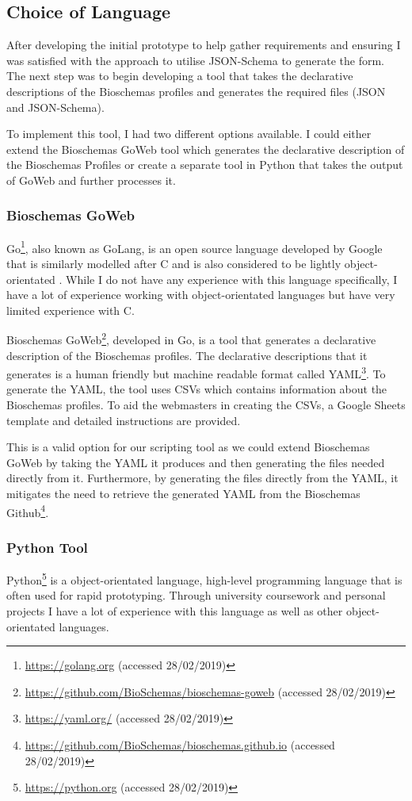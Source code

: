 \subsection{Choice of Language}
After developing the initial prototype to help gather requirements and ensuring I was satisfied with the approach to utilise JSON-Schema to generate the form. The next step was to begin developing a tool that takes the declarative descriptions of the Bioschemas profiles and generates the required files (JSON and JSON-Schema).

To implement this tool, I had two different options available. I could either extend the Bioschemas GoWeb tool which generates the declarative description of the Bioschemas Profiles or create a separate tool in Python that takes the output of GoWeb and further processes it.

\subsubsection{Bioschemas GoWeb}
Go\footnote{\url{https://golang.org} (accessed 28/02/2019)}, also known as GoLang, is an open source language developed by Google that is similarly modelled after C \cite{goLang} and is also considered to be lightly object-orientated \cite{goObject}. While I do not have any experience with this language specifically, I have a lot of experience working with object-orientated languages but have very limited experience with C. 

Bioschemas GoWeb\footnote{\url{https://github.com/BioSchemas/bioschemas-goweb} (accessed 28/02/2019)}, developed in Go, is a tool that generates a declarative description of the Bioschemas profiles. The declarative descriptions that it generates is a human friendly but machine readable format called YAML\footnote{\url{https://yaml.org/} (accessed 28/02/2019)}. To generate the YAML, the tool uses CSVs which contains information about the Bioschemas profiles. To aid the webmasters in creating the CSVs, a Google Sheets template and detailed instructions are provided.

This is a valid option for our scripting tool as we could extend Bioschemas GoWeb by taking the YAML it produces and then generating the files needed directly from it. Furthermore, by generating the files directly from the YAML, it mitigates the need to retrieve the generated YAML from the Bioschemas Github\footnote{\url{https://github.com/BioSchemas/bioschemas.github.io} (accessed 28/02/2019)}.

\subsubsection{Python Tool}
Python\footnote{\url{https://python.org} (accessed 28/02/2019)} is a object-orientated language, high-level programming language that is often used for rapid prototyping. Through university coursework and personal projects I have a lot of experience with this language as well as other object-orientated languages. 

